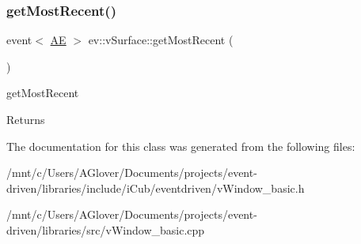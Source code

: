 \subsubsection{\texorpdfstring{get\+Most\+Recent()}{getMostRecent()}}
{\footnotesize\ttfamily event$<$ \hyperlink{classev_1_1AddressEvent}{AE} $>$ ev\+::v\+Surface\+::get\+Most\+Recent (\begin{DoxyParamCaption}{ }\end{DoxyParamCaption})}



get\+Most\+Recent 

\begin{DoxyReturn}{Returns}

\end{DoxyReturn}


The documentation for this class was generated from the following files\+:\begin{DoxyCompactItemize}
\item 
/mnt/c/\+Users/\+A\+Glover/\+Documents/projects/event-\/driven/libraries/include/i\+Cub/eventdriven/v\+Window\+\_\+basic.\+h\item 
/mnt/c/\+Users/\+A\+Glover/\+Documents/projects/event-\/driven/libraries/src/v\+Window\+\_\+basic.\+cpp\end{DoxyCompactItemize}
